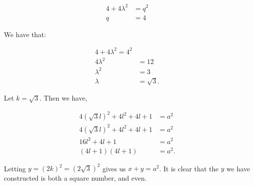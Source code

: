 \documentclass{article}
\begin{document}
\begin{align*}
4 + 4\lambda^2 &= q^2 \\
q &= 4
\end{align*}

We have that:

\begin{align*}
4 + 4\lambda^2 = 4^2 \\
4\lambda^2 &= 12 \\
\lambda^2 &= 3 \\
\lambda &= \sqrt{3}.
\end{align*}

Let $k = \sqrt{3}$. Then we have,

\begin{align*}
4(\sqrt{3}l)^2 + 4l^2 + 4l + 1 &= a^2 \\
4(\sqrt{3}l)^2 + 4l^2 + 4l + 1 &= a^2 \\
16l^2 + 4l + 1 &= a^2 \\
(4l + 1)(4l + 1) &= a^2.
\end{align*}

Letting $y = (2k)^2 = (2\sqrt{3})^2$ gives us $x + y = a^2$. It is clear that the $y$ we have constructed is both a square number, and even.
\end{document}
